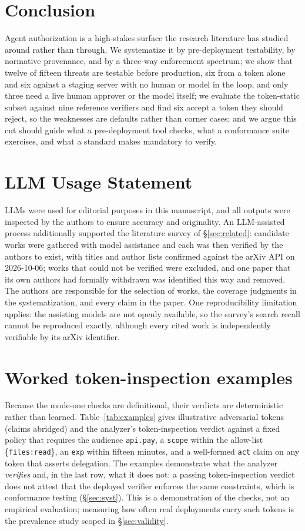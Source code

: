 \section{Conclusion}
Agent authorization is a high-stakes surface the research literature has studied
around rather than through. We systematize it by pre-deployment testability, by
normative provenance, and by a three-way enforcement spectrum; we show that twelve of
fifteen threats are testable before production, six from a token alone and six against
a staging server with no human or model in the loop, and only three need a live human
approver or the model itself; we evaluate the token-static subset against nine
reference verifiers and find six accept a token they should reject, so the weaknesses
are defaults rather than corner cases; and we argue this cut should guide what a
pre-deployment tool checks, what a conformance suite exercises, and what a standard
makes mandatory to verify.

\section*{LLM Usage Statement}
LLMs were used for editorial purposes in this manuscript, and all outputs were
inspected by the authors to ensure accuracy and originality. An LLM-assisted process
additionally supported the literature survey of \S\ref{sec:related}: candidate works
were gathered with model assistance and each was then verified by the authors to
exist, with titles and author lists confirmed against the arXiv API on 2026-10-06;
works that could not be verified were excluded, and one paper that its own authors had
formally withdrawn was identified this way and removed. The authors are responsible
for the selection of works, the coverage judgments in the systematization, and every
claim in the paper. One reproducibility limitation applies: the assisting models are
not openly available, so the survey's search recall cannot be reproduced exactly,
although every cited work is independently verifiable by its arXiv identifier.

\appendix
\section{Worked token-inspection examples}\label{app:examples}
Because the mode-one checks are definitional, their verdicts are deterministic rather
than learned. Table~\ref{tab:examples} gives illustrative adversarial tokens (claims
abridged) and the analyzer's token-inspection verdict against a fixed policy that
requires the audience \texttt{api.pay}, a \texttt{scope} within the allow-list
\{\texttt{files:read}\}, an \texttt{exp} within fifteen minutes, and a well-formed
\texttt{act} claim on any token that asserts delegation. The examples demonstrate what
the analyzer \emph{verifies} and, in the last row, what it does not: a passing
token-inspection verdict does not attest that the deployed verifier enforces the same
constraints, which is conformance testing (\S\ref{sec:syst}). This is a demonstration
of the checks, not an empirical evaluation; measuring how often real deployments carry
such tokens is the prevalence study scoped in \S\ref{sec:validity}.

